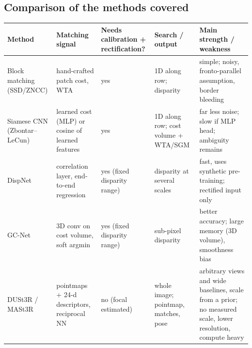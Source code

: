 \documentclass[11pt,a4paper]{article}
\theoremstyle{definition}
\theoremstyle{plain}
\theoremstyle{remark}
\begin{document}
\subsection*{Comparison of the methods covered}
\begin{center}\scriptsize
\renewcommand{\arraystretch}{1.25}
\setlength{\tabcolsep}{3pt}
\begin{tabular}{@{}>{\raggedright\arraybackslash}p{2.0cm}>{\raggedright\arraybackslash}p{2.7cm}>{\raggedright\arraybackslash}p{2.5cm}>{\raggedright\arraybackslash}p{2.5cm}>{\raggedright\arraybackslash}p{3.4cm}@{}}\toprule
\textbf{Method} & \textbf{Matching signal} & \textbf{Needs calibration + rectification?} & \textbf{Search / output} & \textbf{Main strength / weakness}\\\midrule
Block matching (SSD/ZNCC) & hand-crafted patch cost, WTA & yes & 1D along row; disparity & simple; noisy, fronto-parallel assumption, border bleeding\\
Siamese CNN (Zbontar--LeCun) & learned cost (MLP) or cosine of learned features & yes & 1D along row; cost volume + WTA/SGM & far less noise; slow if MLP head; ambiguity remains\\
DispNet & correlation layer, end-to-end regression & yes (fixed disparity range) & disparity at several scales & fast, uses synthetic pre-training; rectified input only\\
GC-Net & 3D conv on cost volume, soft argmin & yes (fixed disparity range) & sub-pixel disparity & better accuracy; large memory (3D volume), smoothness bias\\
DUSt3R / MASt3R & pointmaps + 24-d descriptors, reciprocal NN & no (focal estimated) & whole image; pointmap, matches, pose & arbitrary views and wide baselines, scale from a prior; no measured scale, lower resolution, compute heavy\\\bottomrule
\end{tabular}
\end{center}
\end{document}
